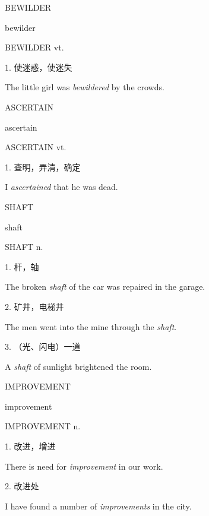 \begin{flashcard}{
BEWILDER

bewilder
}
\begin{center}
BEWILDER vt. 
\end{center}
1. 使迷惑，使迷失

The little girl was \textit{bewildered} by the crowds.

\end{flashcard}
\begin{flashcard}{
ASCERTAIN

ascertain
}
\begin{center}
ASCERTAIN vt. 
\end{center}
1. 查明，弄清，确定

I \textit{ascertained} that he was dead.

\end{flashcard}
\begin{flashcard}{
SHAFT

shaft
}
\begin{center}
SHAFT n. 
\end{center}
1. 杆，轴

The broken \textit{shaft} of the car was repaired in the garage.

2. 矿井，电梯井

The men went into the mine through the \textit{shaft}.

3. （光、闪电）一道

A \textit{shaft} of sunlight brightened the room.

\end{flashcard}
\begin{flashcard}{
IMPROVEMENT

improvement
}
\begin{center}
IMPROVEMENT n. 
\end{center}
1. 改进，增进

There is need for \textit{improvement} in our work.

2. 改进处

I have found a number of \textit{improvements} in the city.

\end{flashcard}
